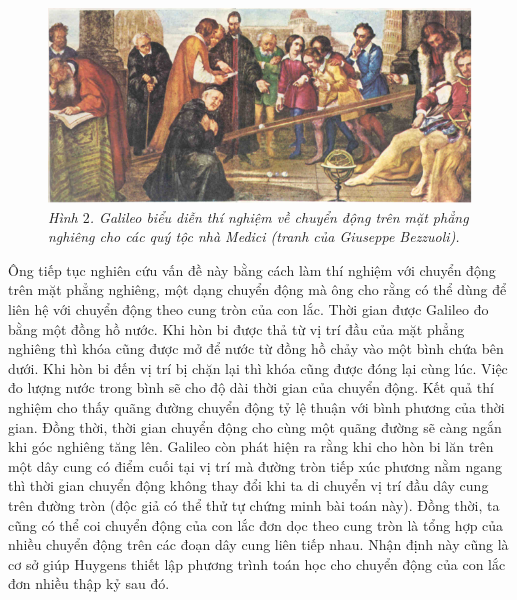 \begin{multicols}{2}
	\begin{figure}[H]
		\vspace*{-5pt}
		\centering
		\captionsetup{labelformat= empty, justification=centering}
		\includegraphics[width= 1\linewidth]{2}
		\caption{\small\textit{\color{timhieukhoahoc}Hình $2$. Galileo biểu diễn thí nghiệm về chuyển động trên mặt phẳng nghiêng cho các quý tộc nhà Medici (tranh của Giuseppe  Bezzuoli).}}
		\vspace*{-10pt}
	\end{figure}
	Ông tiếp tục nghiên cứu vấn đề này bằng cách làm thí nghiệm với chuyển động trên mặt phẳng nghiêng, một dạng chuyển động mà ông cho rằng có thể dùng để liên hệ với chuyển động theo cung tròn của con lắc. Thời gian được Galileo đo bằng một đồng hồ nước. Khi hòn bi được thả từ vị trí đầu của mặt phẳng nghiêng thì khóa cũng được mở để nước từ đồng hồ chảy vào một bình chứa bên dưới. Khi hòn bi đến vị trí bị chặn lại thì khóa cũng được đóng lại cùng lúc. Việc đo lượng nước trong bình sẽ cho độ dài thời gian của chuyển động. Kết quả thí nghiệm cho thấy quãng đường chuyển động tỷ lệ thuận với bình phương của thời gian. Đồng thời, thời gian chuyển động cho cùng một quãng đường sẽ càng ngắn khi góc nghiêng tăng lên.
	\vskip 0.1cm
	Galileo còn phát hiện ra rằng khi cho hòn bi lăn trên một dây cung có điểm cuối tại vị trí mà đường tròn tiếp xúc phương nằm ngang thì thời gian chuyển động không thay đổi khi ta di chuyển vị trí đầu dây cung trên đường tròn (độc giả có thể thử tự chứng minh bài toán này). Đồng thời, ta cũng có thể coi chuyển động của con lắc đơn dọc theo cung tròn là tổng hợp của nhiều chuyển động trên các đoạn dây cung liên tiếp nhau. Nhận định này cũng là cơ sở giúp Huygens thiết lập phương trình toán học cho chuyển động của con lắc đơn nhiều thập kỷ sau đó.
	\begin{figure}[H]
		\vspace*{-5pt}
		\centering
		\captionsetup{labelformat= empty, justification=centering}

\end{figure}
\end{multicols}
